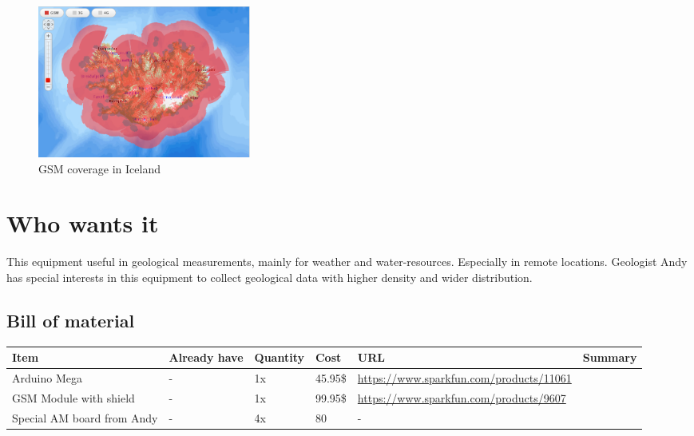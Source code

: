 \documentclass[12pt,a4paper,titlepage]{article}
\begin{document}
\begin{figure}
\centering
\includegraphics[height=50mm]{graphics/GSM_Coverage.PNG}
\caption{GSM coverage in Iceland\label{fig:GSM-Coverage} \cite{vodafone}}
\end{figure}


\section{Who wants it} 
 This equipment useful in geological measurements, mainly for weather and water-resources. Especially in remote locations. 
 Geologist Andy has special interests in this equipment to collect geological data with higher density and wider distribution. 
 


\subsection{Bill of material} %
\begin{center}
    \begin{tabular}{ | p{1.5cm} | p{1.4cm} | p{1.5cm} | l | p{5.5cm} | p{5cm} |}
    \hline
    Item & Already have & Quantity & Cost & URL & Summary \\ \hline
    
    Arduino Mega & - & 1x & 45.95\$ & \url{https://www.sparkfun.com/products/11061} &  \\ \hline
    
    GSM Module with shield & - & 1x & 99.95\$ & \url{https://www.sparkfun.com/products/9607} &  \\ \hline
    
	Special AM board from Andy & - & 4x & 80 & - &  \\ \hline
    \end{tabular}
\end{center}
 



\end{document}
